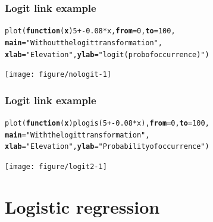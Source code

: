 \documentclass[color=usenames,dvipsnames]{beamer}\usepackage[]{graphicx}\usepackage[]{color}
\makeatletter
\newcommand{\hlnum}[1]{\textcolor[rgb]{0.69,0.494,0}{#1}}%
\newcommand{\hlstr}[1]{\textcolor[rgb]{0.749,0.012,0.012}{#1}}%
\newcommand{\hlopt}[1]{\textcolor[rgb]{0,0,0}{#1}}%
\newcommand{\hlstd}[1]{\textcolor[rgb]{0,0,0}{#1}}%
\newcommand{\hlkwa}[1]{\textcolor[rgb]{0,0,0}{\textbf{#1}}}%
\newcommand{\hlkwc}[1]{\textcolor[rgb]{0,0,0}{\textbf{#1}}}%
\newcommand{\hlkwd}[1]{\textcolor[rgb]{0.004,0.004,0.506}{#1}}%
\newenvironment{kframe}{%
 \def\at@end@of@kframe{}%
 \ifinner\ifhmode%
  \def\at@end@of@kframe{\end{minipage}}%
  \begin{minipage}{\columnwidth}%
 \fi\fi%
 \def\FrameCommand##1{\hskip\@totalleftmargin \hskip-\fboxsep
 \colorbox{shadecolor}{##1}\hskip-\fboxsep
     \hskip-\linewidth \hskip-\@totalleftmargin \hskip\columnwidth}%
 \MakeFramed {\advance\hsize-\width
   \@totalleftmargin\z@ \linewidth\hsize
   \@setminipage}}%
 {\par\unskip\endMakeFramed%
 \at@end@of@kframe}
\newenvironment{knitrout}{}{} %
\makeatother
\begin{document}
\begin{frame}[fragile]
  \frametitle{Logit link example}
\begin{knitrout}\scriptsize
{}\color{fgcolor}\begin{kframe}
\begin{alltt}
\hlkwd{plot}\hlstd{(}\hlkwa{function}\hlstd{(}\hlkwc{x}\hlstd{)} \hlnum{5} \hlopt{+ -}\hlnum{0.08}\hlopt{*}\hlstd{x,} \hlkwc{from}\hlstd{=}\hlnum{0}\hlstd{,} \hlkwc{to}\hlstd{=}\hlnum{100}\hlstd{,}
     \hlkwc{main}\hlstd{=}\hlstr{"Without the logit transformation"}\hlstd{,}
     \hlkwc{xlab}\hlstd{=}\hlstr{"Elevation"}\hlstd{,} \hlkwc{ylab}\hlstd{=}\hlstr{"logit(prob of occurrence)"}\hlstd{)}
\end{alltt}
\end{kframe}
\end{knitrout}
\centering
  \texttt{[image: figure/nologit-1]} \\
\end{frame}




\begin{frame}[fragile]
  \frametitle{Logit link example}
\begin{knitrout}\scriptsize
{}\color{fgcolor}\begin{kframe}
\begin{alltt}
\hlkwd{plot}\hlstd{(}\hlkwa{function}\hlstd{(}\hlkwc{x}\hlstd{)} \hlkwd{plogis}\hlstd{(}\hlnum{5} \hlopt{+ -}\hlnum{0.08}\hlopt{*}\hlstd{x),} \hlkwc{from}\hlstd{=}\hlnum{0}\hlstd{,} \hlkwc{to}\hlstd{=}\hlnum{100}\hlstd{,}
     \hlkwc{main}\hlstd{=}\hlstr{"With the logit transformation"}\hlstd{,}
     \hlkwc{xlab}\hlstd{=}\hlstr{"Elevation"}\hlstd{,} \hlkwc{ylab}\hlstd{=}\hlstr{"Probability of occurrence"}\hlstd{)}
\end{alltt}
\end{kframe}
\end{knitrout}
\centering
  \texttt{[image: figure/logit2-1]} \\
\end{frame}





\section{Logistic regression}
\end{document}

